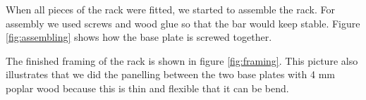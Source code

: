 \documentclass{acm_proc_article-sp}
\begin{document}
When all pieces of the rack were fitted, we started to assemble the rack. For assembly we used screws and wood glue so that the bar would keep stable. Figure \ref{fig:assembling} shows how the base plate is screwed together.

\begin{minipage}{\linewidth}%
\label{fig:framing}%
\end{minipage}


The finished framing of the rack is shown in figure \ref{fig:framing}. This picture also illustrates that we did the panelling between the two base plates with 4 mm poplar wood because this is thin and flexible that it can be bend.

\begin{minipage}{\linewidth}%
\label{fig:filling}%
\end{minipage}
\end{document}
